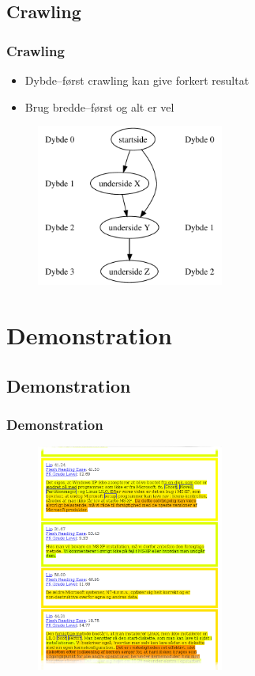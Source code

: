 \documentclass{beamer}
\begin{document}
\subsection{Crawling}
\begin{frame}
  \frametitle{Crawling}
  \begin{itemize}
  \item<1-> Dybde--først crawling kan give forkert resultat
  \item<2-> Brug bredde--først og alt er vel
  \end{itemize}
  \begin{figure}
    \includegraphics[width=0.55\textwidth]{depthtreeill.pdf}
  \end{figure}
\end{frame}


\section{Demonstration}
\subsection{Demonstration}
\begin{frame}
  \frametitle{Demonstration}
  \begin{figure}
    \includegraphics[width=0.55\textwidth]{webanalyzeroutput.pdf}
  \end{figure}
\end{frame}
\end{document}
